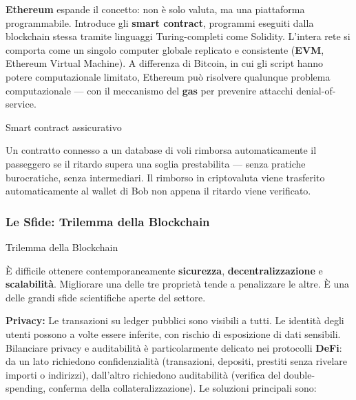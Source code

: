 \documentclass[
  italian,
  openany]{book}
\begin{document}
\textbf{Ethereum} espande il concetto: non è solo valuta, ma una
piattaforma programmabile. Introduce gli \textbf{smart contract},
programmi eseguiti dalla blockchain stessa tramite linguaggi
Turing-completi come Solidity. L'intera rete si comporta come un singolo
computer globale replicato e consistente (\textbf{EVM}, Ethereum Virtual
Machine). A differenza di Bitcoin, in cui gli script hanno potere
computazionale limitato, Ethereum può risolvere qualunque problema
computazionale --- con il meccanismo del \textbf{gas} per prevenire
attacchi denial-of-service.

\begin{callouttip}{Smart contract assicurativo}

Un contratto connesso a un database di voli rimborsa automaticamente il
passeggero se il ritardo supera una soglia prestabilita --- senza
pratiche burocratiche, senza intermediari. Il rimborso in criptovaluta
viene trasferito automaticamente al wallet di Bob non appena il ritardo
viene verificato.

\end{callouttip}

\subsubsection{Le Sfide: Trilemma della
Blockchain}\label{le-sfide-trilemma-della-blockchain}

\begin{calloutwarning}{Trilemma della Blockchain}

È difficile ottenere contemporaneamente \textbf{sicurezza},
\textbf{decentralizzazione} e \textbf{scalabilità}. Migliorare una delle
tre proprietà tende a penalizzare le altre. È una delle grandi sfide
scientifiche aperte del settore.

\end{calloutwarning}

\textbf{Privacy:} Le transazioni su ledger pubblici sono visibili a
tutti. Le identità degli utenti possono a volte essere inferite, con
rischio di esposizione di dati sensibili. Bilanciare privacy e
auditabilità è particolarmente delicato nei protocolli \textbf{DeFi}: da
un lato richiedono confidenzialità (transazioni, depositi, prestiti
senza rivelare importi o indirizzi), dall'altro richiedono auditabilità
(verifica del double-spending, conferma della collateralizzazione). Le
soluzioni principali sono:
\end{document}
